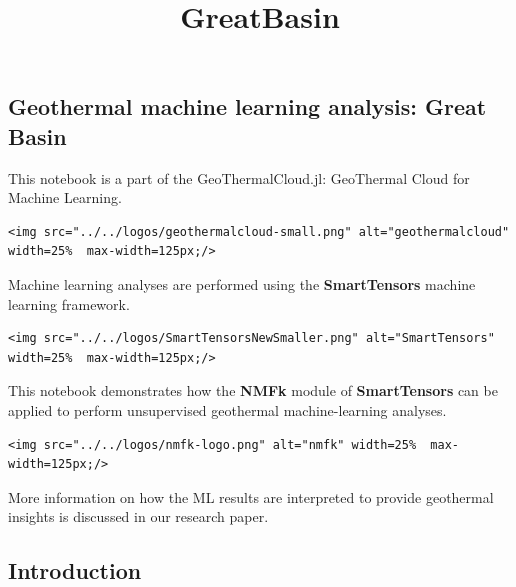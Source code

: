 \documentclass[11pt]{article}
\title{GreatBasin}
\begin{document}
    \maketitle




    \hypertarget{geothermal-machine-learning-analysis-great-basin}{%
\subsection{Geothermal machine learning analysis: Great
Basin}\label{geothermal-machine-learning-analysis-great-basin}}

This notebook is a part of the GeoThermalCloud.jl: GeoThermal Cloud for Machine
Learning.

\begin{verbatim}
<img src="../../logos/geothermalcloud-small.png" alt="geothermalcloud" width=25%  max-width=125px;/>
\end{verbatim}

Machine learning analyses are performed using the \textbf{SmartTensors}
machine learning framework.

\begin{verbatim}
<img src="../../logos/SmartTensorsNewSmaller.png" alt="SmartTensors" width=25%  max-width=125px;/>
\end{verbatim}

This notebook demonstrates how the \textbf{NMFk} module of
\textbf{SmartTensors} can be applied to perform unsupervised geothermal
machine-learning analyses.

\begin{verbatim}
<img src="../../logos/nmfk-logo.png" alt="nmfk" width=25%  max-width=125px;/>
\end{verbatim}

More information on how the ML results are interpreted to provide
geothermal insights is discussed in our research paper.

    \hypertarget{introduction}{%
\subsection{Introduction}\label{introduction}}
\end{document}
